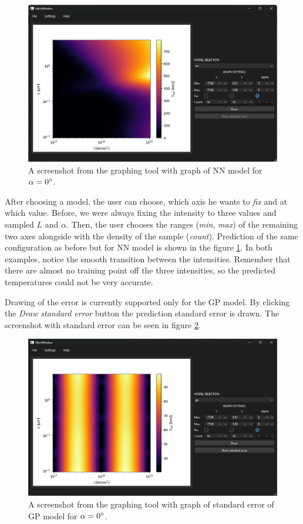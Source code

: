 \begin{figure}[h]
	\centering
	\includegraphics[width=0.85 \textwidth]{figures/graph_tool2}
	\caption{A screenshot from the graphing tool with graph of NN model for $\alpha = 0\degree$.}
	\label{fig:graph-tool2}
\end{figure}


After choosing a model, the user can choose, which axis he wants to \textit{fix} and at which value. Before, we were always fixing the intensity to three values and sampled $L$ and $\alpha$. Then, the user chooses the ranges (\textit{min}, \textit{max}) of the remaining two axes alongside with the density of the sample (\textit{count}). Prediction of the same configuration as before but for NN model is shown in the figure \ref{fig:graph-tool2}. In both examples, notice the smooth transition between the intensities. Remember that there are almost no training point off the three intensities, so the predicted temperatures could not be very accurate.

Drawing of the error is currently supported only for the GP model. By clicking the \textit{Draw standard error} button the prediction standard error is drawn. The screenshot with standard error can be seen in figure \ref{fig:graph-tool3}.
\begin{figure}[h]
	\centering
	\includegraphics[width=0.85 \textwidth]{figures/graph_tool3}
	\caption{A screenshot from the graphing tool with graph of standard error of GP model for $\alpha = 0\degree$.}
	\label{fig:graph-tool3}
\end{figure}

